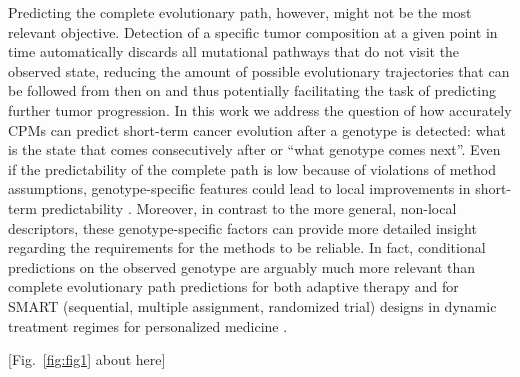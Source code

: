 \documentclass[a4paper,10pt]{article}
\begin{document}
Predicting the complete evolutionary path, however, might not be the most
relevant objective. Detection of a specific tumor composition at a given
point in time automatically discards all mutational pathways that do not
visit the observed state, reducing the amount of possible evolutionary
trajectories that can be followed from then on and thus potentially
facilitating the task of predicting further tumor progression. In this
work we address the question of how accurately CPMs can predict short-term
cancer evolution after a genotype is detected: what is the state that
comes consecutively after or ``what genotype comes next''. Even if the
predictability of the complete path is low because of violations of method
assumptions, genotype-specific features could lead to local improvements
in short-term predictability \cite{bank_predictability_2016,
  visser2018,ferretti2018}. Moreover, in contrast to the more general,
non-local descriptors, these genotype-specific factors can provide more
detailed insight regarding the requirements for the methods to be
reliable. In fact, conditional predictions on the observed genotype are
arguably much more relevant than complete evolutionary path predictions
for both adaptive therapy \cite[e.g.,][]{melnikov2020,hansen2020a,
  stankova2019a} and for SMART (sequential, multiple assignment,
randomized trial) designs in dynamic treatment regimes for personalized
medicine \cite{tsiatis2020,chakraborty2013}.



[Fig.~\ref{fig:fig1} about here]



\end{document}
